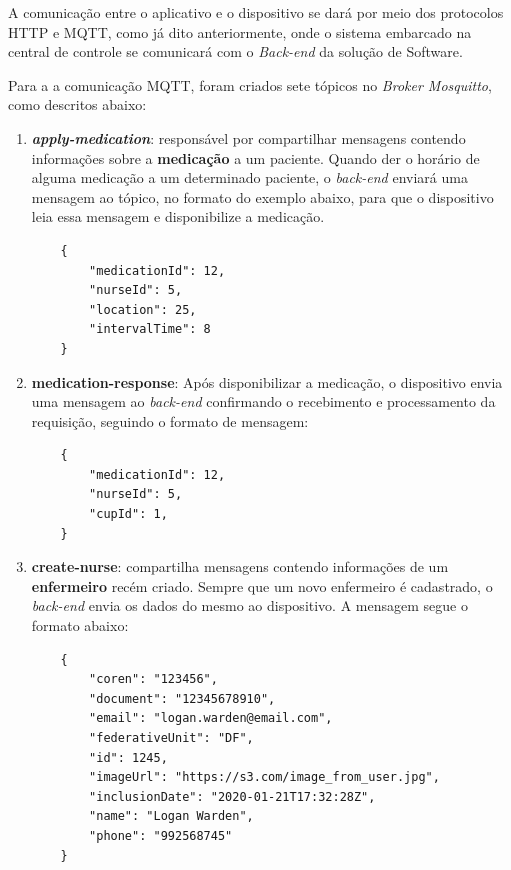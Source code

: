 A comunicação entre o aplicativo e o dispositivo se dará por meio dos protocolos HTTP e MQTT, como já dito anteriormente, onde o sistema embarcado na central de controle se comunicará com o \textit{Back-end} da solução de Software.

Para a a comunicação MQTT, foram criados sete tópicos no \textit{Broker Mosquitto}, como descritos abaixo:

\begin{enumerate}
    \item \textbf{\textit{apply-medication}}: responsável por compartilhar mensagens contendo informações sobre a \textbf{medicação} a um paciente. Quando der o horário de alguma medicação a um determinado paciente, o \textit{back-end} enviará uma mensagem ao tópico, no formato do exemplo abaixo, para que o dispositivo leia essa mensagem e disponibilize a medicação.
    
    \begin{verbatim}
    {
        "medicationId": 12,
        "nurseId": 5,
        "location": 25,
        "intervalTime": 8
    }
    \end{verbatim}
    
    \item \textbf{medication-response}: Após disponibilizar a medicação, o dispositivo envia uma mensagem ao \textit{back-end} confirmando o recebimento e processamento da requisição, seguindo o formato de mensagem:
    
    \begin{verbatim}
    {
        "medicationId": 12,
        "nurseId": 5,
        "cupId": 1,
    }
    \end{verbatim}
    
    \item \textbf{create-nurse}: compartilha mensagens contendo informações de um \textbf{enfermeiro} recém criado. Sempre que um novo enfermeiro é cadastrado, o \textit{back-end} envia os dados do mesmo ao dispositivo. A mensagem segue o formato abaixo:
    
    \begin{verbatim}
    {
        "coren": "123456",
        "document": "12345678910",
        "email": "logan.warden@email.com",
        "federativeUnit": "DF",
        "id": 1245,
        "imageUrl": "https://s3.com/image_from_user.jpg",
        "inclusionDate": "2020-01-21T17:32:28Z",
        "name": "Logan Warden",
        "phone": "992568745"
    }
    \end{verbatim}
    

\end{enumerate}
